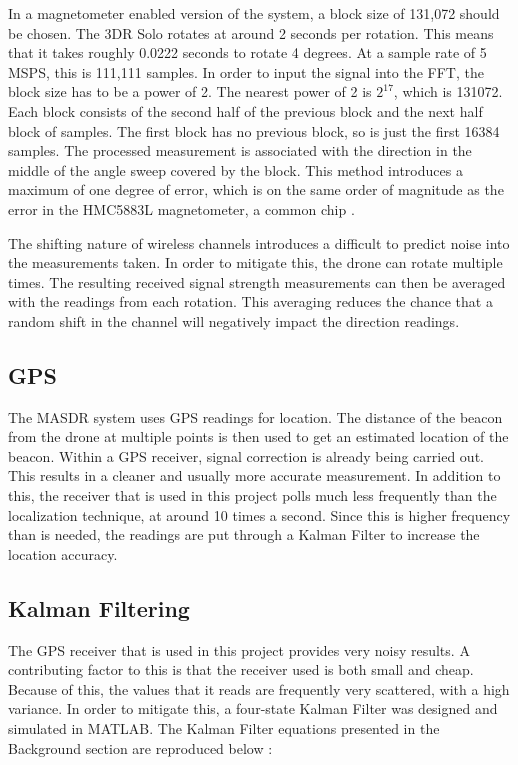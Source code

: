 In a magnetometer enabled version of the system, a block size of 131,072 should be chosen. The 3DR Solo rotates at around 2 seconds per rotation. This means that it takes roughly 0.0222 seconds to rotate 4 degrees. At a sample rate of 5 MSPS, this is 111,111 samples. In order to input the signal into the FFT, the block size has to be a power of 2. The nearest power of 2 is $2^{17}$, which is 131072. Each block consists of the second half of the previous block and the next half block of samples. The first block has no previous block, so is just the first 16384 samples. The processed measurement is associated with the direction in the middle of the angle sweep covered by the block. This method introduces a maximum of one degree of error, which is on the same order of magnitude as the error in the HMC5883L magnetometer, a common chip \cite{magnetometer_data}. \par 
The shifting nature of wireless channels introduces a difficult to predict noise into the measurements taken. In order to mitigate this, the drone can rotate multiple times. The resulting received signal strength measurements can then be averaged with the readings from each rotation. This averaging reduces the chance that a random shift in the channel will negatively impact the direction readings. \par 
\subsection{GPS}
The MASDR system uses GPS readings for location. The distance of the beacon from the drone at multiple points is then used to get an estimated location of the beacon. Within a GPS receiver, signal correction is already being carried out. This results in a cleaner and usually more accurate measurement. In addition to this, the receiver that is used in this project polls much less frequently than the localization technique, at around 10 times a second. Since this is higher frequency than is needed, the readings are put through a Kalman Filter to increase the location accuracy. \par 
\subsection{Kalman Filtering}\label{methods:kf}
The GPS receiver that is used in this project provides very noisy results. A contributing factor to this is that the receiver used is both small and cheap. Because of this, the values that it reads are frequently very scattered, with a high variance. In order to mitigate this, a four-state Kalman Filter was designed and simulated in MATLAB. The Kalman Filter equations presented in the Background section are reproduced below \cite{kf_book}: \par
